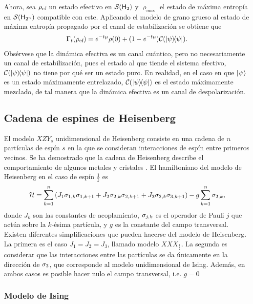 Ahora, sea $\rho_{\text{ef}}$ un estado efectivo en $\mathcal{S}({\sf H}_{2})$ y $\varrho_{\max}$ el estado de máxima entropía en $\mathcal{S}({\sf H}_{2^{n}})$ compatible con este. Aplicando el modelo de grano grueso al estado de máxima entropía propagado por el canal de estabilización se obtiene que
\begin{equation}\label{eq:EffectiveStabilizing}
    \Gamma_{t}(\rho_{\ef})=e^{-t\mu}\rho(0)+(1-e^{-t \mu})\mcC(\dyad{\psi}).\nonumber
\end{equation}
Obsérvese que la dinámica efectiva es un canal cuántico, pero no necesariamente un canal de estabilización, pues el estado al que tiende el sistema efectivo, $\mcC(\dyad{\psi})$ no tiene por qué ser un estado puro. En realidad, en el caso en que $\ket{\psi}$ es un estado máximamente entrelazado, $\mcC(\dyad{\psi})$ es el estado máximamente mezclado, de tal manera que la dinámica efectiva es un canal de despolarización.

\subsection{Cadena de espines de Heisenberg}

El modelo $XZY_{s}$ unidimensional de Heisenberg consiste en una cadena de $n$ partículas de espín $s$ en la que se consideran interacciones de espín entre primeros vecinos. Se ha demostrado que la cadena de Heisenberg describe el comportamiento de algunos metales y cristales \cite{HeisenbergModel}. El hamiltoniano del modelo de Heisenberg en el caso de espín $\frac{1}{2}$ es
\begin{equation}
    \mathcal{H}=\sum_{k=1}^{n}\qty(J_{1}\sigma_{1,k}\sigma_{1,k+1}+J_{2}\sigma_{2,k}\sigma_{2,k+1}+J_{3}\sigma_{3,k}\sigma_{3,k+1})-g\sum_{k=1}^{n}\sigma_{2,k},
\end{equation}
donde $J_{k}$ son las constantes de acoplamiento, $\sigma_{j,k}$ es el operador de Pauli $j$ que actúa sobre la $k$-ésima partícula, y $g$ es la constante del campo transversal. Existen diferentes simplificaciones que pueden hacerse del modelo de Heisenberg. La primera es el caso $J_{1}=J_{2}=J_{3}$, llamado modelo $XXX_{\frac{1}{2}}$. La segunda es considerar que las interacciones entre las partículas se da únicamente en la dirección de $\sigma_{3}$, que corresponde al modelo unidimensional de Ising. Además, en ambos casos es posible hacer nulo el campo transversal, i.e. $g=0$

\subsubsection{Modelo de Ising}

